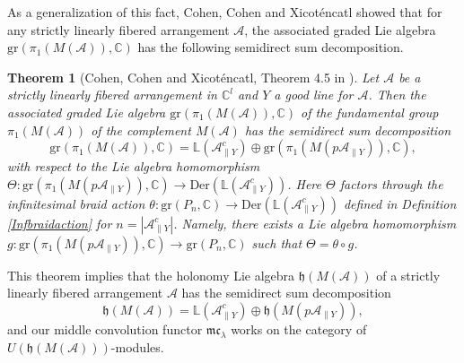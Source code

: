 \documentclass[a4paper,12pt]{article}
\newcommand{\C}{\mathbb{C}}
\newtheorem{thm}{Theorem}[section]
\theoremstyle{definition}
\theoremstyle{remark}
\begin{document}
As a generalization of this fact,
Cohen, Cohen and Xicot\'encatl \cite{CCX03} showed 
that for any strictly linearly fibered arrangement $\mathcal{A}$,
the associated graded Lie algebra $\mathrm{gr}(\pi_{1}(M(\mathcal{A})),\mathbb{C})$
has the following semidirect sum decomposition.
\begin{thm}[Cohen, Cohen and Xicot\'encatl, Theorem 4.5 in \cite{CCX03}]\label{thm:CCX}
Let $\mathcal{A}$ be a strictly linearly fibered arrangement in $\C^{l}$ and $Y$ a good line for $\mathcal{A}$.
Then the associated graded Lie algebra $\mathrm{gr}(\pi_{1}(M(\mathcal{A})),\mathbb{C})$ of the fundamental group $\pi_{1}(M(\mathcal{A}))$ of the complement $M(\mathcal{A})$ has the semidirect sum decomposition
\[
	\mathrm{gr}(\pi_{1}(M(\mathcal{A})),\mathbb{C})=
	\mathbb{L}(\mathcal{A}_{\parallel Y}^{c})\oplus \mathrm{gr}(\pi_{1}(M(p\mathcal{A}_{\parallel Y})),\mathbb{C}),
\]
with respect to the Lie algebra homomorphism $\Theta \colon \mathrm{gr}(\pi_{1}(M(p\mathcal{A}_{\parallel Y})),\mathbb{C})\to \mathrm{Der}(\mathbb{L}(\mathcal{A}_{\parallel Y}^{c}))$.
Here $\Theta$ factors 
through the infinitesimal braid action 
$\theta\colon \mathrm{gr}(P_{n},\mathbb{C})\to \mathrm{Der}(\mathbb{L}(\mathcal{A}_{\parallel Y}^{c}))$
defined in Definition \ref{Infbraidaction} for $n=|\mathcal{A}_{\parallel Y}^{c}|$.
Namely, there exists a Lie algebra homomorphism $g\colon \mathrm{gr}(\pi_{1}(M(p\mathcal{A}_{\parallel Y})),\mathbb{C})\to \mathrm{gr}(P_{n},\mathbb{C})$ such that $\Theta=\theta\circ g$.
\end{thm}
This theorem implies that the holonomy Lie algebra $\mathfrak{h}(M(\mathcal{A}))$ of a strictly linearly fibered arrangement $\mathcal{A}$ has the semidirect sum decomposition
\[	
	\mathfrak{h}(M(\mathcal{A}))=
	\mathbb{L}(\mathcal{A}_{\parallel Y}^{c})\oplus \mathfrak{h}(M(p\mathcal{A}_{\parallel Y})),
\]
and our middle convolution functor $\mathfrak{mc}_{\lambda}$ 
works on the category of $U(\mathfrak{h}(M(\mathcal{A})))$-modules.
\end{document}
